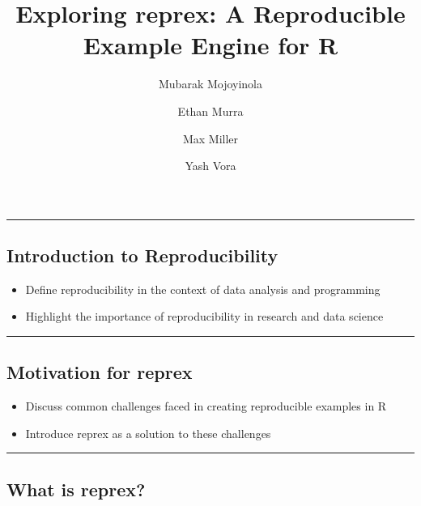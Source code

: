 \documentclass[
  letterpaper,
  DIV=11,
  numbers=noendperiod]{scrartcl}
\title{Exploring reprex: A Reproducible Example Engine for R}
\author{Mubarak Mojoyinola \and Ethan Murra \and Max Miller \and Yash
Vora}
\date{}
\providecommand{\tightlist}{%
  \setlength{\itemsep}{0pt}\setlength{\parskip}{0pt}}\usepackage{longtable,booktabs,array}
\begin{document}
\maketitle
\ifdefined\Shaded\renewenvironment{Shaded}{\begin{tcolorbox}[frame hidden, enhanced, boxrule=0pt, interior hidden, breakable, sharp corners, borderline west={3pt}{0pt}{shadecolor}]}{\end{tcolorbox}}\fi

\begin{center}\rule{0.5\linewidth}{0.5pt}\end{center}

\hypertarget{introduction-to-reproducibility}{%
\subsection{Introduction to
Reproducibility}\label{introduction-to-reproducibility}}

\begin{itemize}
\tightlist
\item
  Define reproducibility in the context of data analysis and programming
\item
  Highlight the importance of reproducibility in research and data
  science
\end{itemize}

\begin{center}\rule{0.5\linewidth}{0.5pt}\end{center}

\hypertarget{motivation-for-reprex}{%
\subsection{Motivation for reprex}\label{motivation-for-reprex}}

\begin{itemize}
\tightlist
\item
  Discuss common challenges faced in creating reproducible examples in R
\item
  Introduce reprex as a solution to these challenges
\end{itemize}

\begin{center}\rule{0.5\linewidth}{0.5pt}\end{center}

\hypertarget{what-is-reprex}{%
\subsection{What is reprex?}\label{what-is-reprex}}
\end{document}
